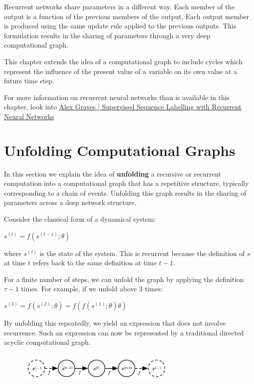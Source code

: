 \documentclass[letterpaper, 12pt]{report}
\begin{document}
Recurrent networks share parameters in a different way. Each member of the output is a function of the previous members of the output. Each output member is produced using the same update rule applied to the previous outputs. This formulation results in the sharing of parameters through a very deep computational graph. 

This chapter extends the idea of a computational graph to include cycles which represent the influence of the present value of a variable on its own value at a future time step. 

For more information on recurrent neural networks than is available in this chapter, look into \href{https://www.cs.toronto.edu/~graves/preprint.pdf}{Alex Graves | Supervised Sequence Labelling with Recurrent Neural Networks}

\section{Unfolding Computational Graphs}

In this section we explain the idea of \textbf{unfolding} a recursive or recurrent computation into a computational graph that has a repetitive structure, typically corresponding to a chain of events. Unfolding this graph results in the sharing of parameters across a deep network structure. 

Consider the classical form of a dynamical system: 

\begin{center}
  $s^{(t)} = f(s^{(t-1)}; \theta)$
\end{center}

where $s^{(t)}$ is the state of the system. This is recurrent because the definition of $s$ at time $t$ refers back to the same definition at time $t-1$. 

For a finite number of steps, we can unfold the graph by applying the definition $\tau - 1$ times. For example, if we unfold above 3 times:

\begin{center}
  $s^{(3)} = f(s^{(2)}; \theta) = f(f(s^{(1)}; \theta) \theta)$
\end{center}

By unfolding this repeatedly, we yield an expression that does not involve recurrence. Such an expression can now be represented by a traditional directed acyclic computational graph. 

\begin{figure}[h]
  \centering
  \includegraphics[width=0.7\textwidth]{trad_dag.png}
\end{figure}
\end{document}
